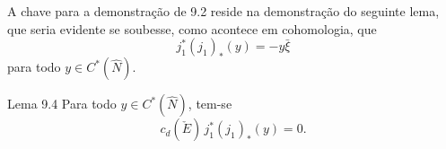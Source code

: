 A chave para a demonstração de 9.2 reside na demonstração do seguinte lema, que seria evidente se soubesse, como acontece em cohomologia, que
\[
j_1^*(j_1)_*(y)=-y\bar\xi
\]
para todo $y\in C^*(\widehat N)$.

\begin{statement}{Lema 9.4}
Para todo $y\in C^*(\widehat N)$, tem-se
\[
c_d(\check E)\,j_1^*(j_1)_*(y)=0.
\]
\end{statement}
